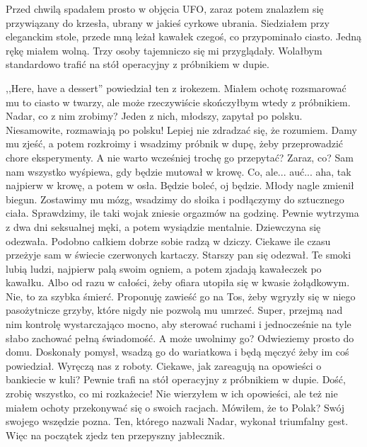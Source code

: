 Przed chwilą spadałem prosto w objęcia UFO, zaraz potem znalazłem się przywiązany do krzesła, ubrany w jakieś cyrkowe ubrania.
Siedziałem przy eleganckim stole, przede mną leżał kawałek czegoś, co przypominało ciasto. Jedną rękę miałem wolną.
Trzy osoby tajemniczo się mi przyglądały. Wolałbym standardowo trafić na stół operacyjny z próbnikiem w dupie.
\begin{dialogue}
\ds{} ,,Here, have a dessert'' \dm{} powiedział ten z irokezem. Miałem ochotę rozsmarować mu to ciasto w twarzy, ale może rzeczywiście skończyłbym wtedy z próbnikiem.
\ds{} Nadar, co z nim zrobimy? \dm{} Jeden z nich, młodszy, zapytał po polsku. Niesamowite, rozmawiają po polsku! Lepiej nie zdradzać się, że rozumiem.
\ds{} Damy mu zjeść, a potem rozkroimy i wsadzimy próbnik w dupę, żeby przeprowadzić chore eksperymenty.
\ds{} A nie warto wcześniej trochę go przepytać? Zaraz, co?
\ds{} Sam nam wszystko wyśpiewa, gdy będzie mutował w krowę.
\ds{} Co, ale... auć... aha, tak najpierw w krowę, a potem w osła. Będzie boleć, oj będzie. \dm{} Młody nagle zmienił biegun.
\ds{} Zostawimy mu mózg, wsadzimy do słoika i podłączymy do sztucznego ciała.
\ds{} Sprawdzimy, ile taki wojak zniesie orgazmów na godzinę. Pewnie wytrzyma z dwa dni seksualnej męki, a potem wysiądzie mentalnie. \dm{} Dziewczyna się odezwała.
\ds{} Podobno całkiem dobrze sobie radzą w dziczy. Ciekawe ile czasu przeżyje sam w świecie czerwonych kartaczy. \dm{} Starszy pan się odezwał.
\ds{} Te smoki lubią ludzi, najpierw palą swoim ogniem, a potem zjadają kawałeczek po kawałku.
\ds{} Albo od razu w całości, żeby ofiara utopiła się w kwasie żołądkowym.
\ds{} Nie, to za szybka śmierć. Proponuję zawieść go na Tos, żeby wgryzły się w niego pasożytnicze grzyby, które nigdy nie pozwolą mu umrzeć.
\ds{} Super, przejmą nad nim kontrolę wystarczająco mocno, aby sterować ruchami i jednocześnie na tyle słabo zachować pełną świadomość.
\ds{} A może uwolnimy go? Odwieziemy prosto do domu.
\ds{} Doskonały pomysł, wsadzą go do wariatkowa i będą męczyć żeby im coś powiedział. Wyręczą nas z roboty. Ciekawe, jak zareagują na opowieści o bankiecie w kuli?
\ds{} Pewnie trafi na stół operacyjny z próbnikiem w dupie.
\ds{} Dość, zrobię wszystko, co mi rozkażecie! \dm{} Nie wierzyłem w ich opowieści, ale też nie miałem ochoty przekonywać się o swoich racjach.
\ds{} Mówiłem, że to Polak? Swój swojego wszędzie pozna. \dm{} Ten, którego nazwali Nadar, wykonał triumfalny gest. \dm{} Więc na początek zjedz ten przepyszny jabłecznik.
\end{dialogue}




